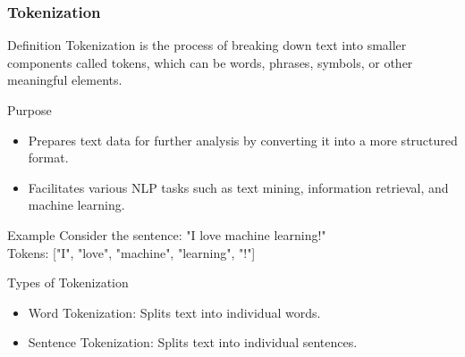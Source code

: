\documentclass{beamer}
\begin{document}
\begin{frame}
    \frametitle{Tokenization}
    \begin{block}{Definition}
        Tokenization is the process of breaking down text into smaller components called tokens, which can be words, phrases, symbols, or other meaningful elements.
    \end{block}
    
    \begin{block}{Purpose}
        \begin{itemize}
            \item Prepares text data for further analysis by converting it into a more structured format.
            \item Facilitates various NLP tasks such as text mining, information retrieval, and machine learning.
        \end{itemize}
    \end{block}

    \begin{block}{Example}
        Consider the sentence: "I love machine learning!" \\
        Tokens: ["I", "love", "machine", "learning", "!"]
    \end{block}

    \begin{block}{Types of Tokenization}
        \begin{itemize}
            \item Word Tokenization: Splits text into individual words.
            \item Sentence Tokenization: Splits text into individual sentences.
        \end{itemize}
    \end{block}
\end{frame}
\end{document}
